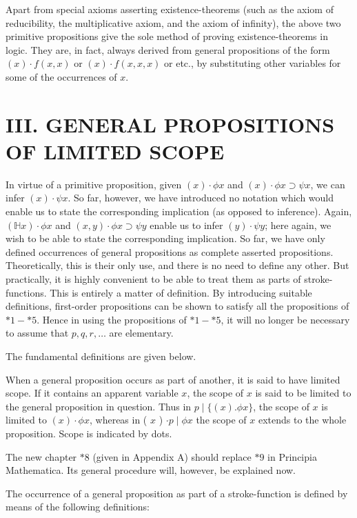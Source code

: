 \documentclass[10pt]{article}
\begin{document}
Apart from special axioms asserting existence-theorems (such as the axiom of reducibility, the multiplicative axiom, and the axiom of infinity), the above two primitive propositions give the sole method of proving existence-theorems in logic. They are, in fact, always derived from general propositions of the form $(x) \cdot f(x, x)$ or $(x) \cdot f(x, x, x)$ or etc., by substituting other variables for some of the occurrences of $x$.

\section*{III. GENERAL PROPOSITIONS OF LIMITED SCOPE}
In virtue of a primitive proposition, given $(x) \cdot \phi x$ and $(x) \cdot \phi x \supset \psi x$, we can infer $(x) \cdot \psi x$. So far, however, we have introduced no notation which would enable us to state the corresponding implication (as opposed to inference). Again, $(\mathbb{H} x) \cdot \phi x$ and $(x, y) \cdot \phi x \supset \psi y$ enable us to infer $(y) \cdot \psi y$; here again, we wish to be able to state the corresponding implication. So far, we have only defined occurrences of general propositions as complete asserted propositions. Theoretically, this is their only use, and there is no need to define any other. But practically, it is highly convenient to be able to treat them as parts of stroke-functions. This is entirely a matter of definition. By introducing suitable definitions, first-order propositions can be shown to satisfy all the propositions of $* 1-* 5$. Hence in using the propositions of $* 1-* 5$, it will no longer be necessary to assume that $p, q, r, \ldots$ are elementary.

The fundamental definitions are given below.

When a general proposition occurs as part of another, it is said to have limited scope. If it contains an apparent variable $x$, the scope of $x$ is said to be limited to the general proposition in question. Thus in $p \mid\{(x) . \phi x\}$, the scope of $x$ is limited to $(x) \cdot \phi x$, whereas in ( $x$ ) $\cdot p \mid \phi x$ the scope of $x$ extends to the whole proposition. Scope is indicated by dots.

The new chapter $* 8$ (given in Appendix A) should replace $* 9$ in Principia Mathematica. Its general procedure will, however, be explained now.

The occurrence of a general proposition as part of a stroke-function is defined by means of the following definitions:
\end{document}
